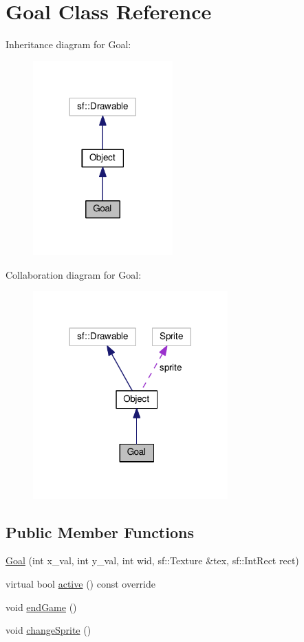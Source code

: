 \hypertarget{classGoal}{\section{Goal Class Reference}
\label{classGoal}
}


Inheritance diagram for Goal\+:
\nopagebreak
\begin{figure}[H]
\begin{center}
\leavevmode
\includegraphics[width=152pt]{classGoal__inherit__graph}
\end{center}
\end{figure}


Collaboration diagram for Goal\+:
\nopagebreak
\begin{figure}[H]
\begin{center}
\leavevmode
\includegraphics[width=212pt]{classGoal__coll__graph}
\end{center}
\end{figure}
\subsection*{Public Member Functions}
\begin{DoxyCompactItemize}
\item 
\hyperlink{classGoal_a579c482283005118e153af04d12d6326}{Goal} (int x\+\_\+val, int y\+\_\+val, int wid, sf\+::\+Texture \&tex, sf\+::\+Int\+Rect rect)
\item 
virtual bool \hyperlink{classGoal_ad23408eab330967a7fe0d13e580c667a}{active} () const override
\item 
void \hyperlink{classGoal_a4126af8f725af061df89124c1d9d2dfb}{end\+Game} ()
\item 
void \hyperlink{classGoal_adee29e993c9b988bd0cc15a12c86452d}{change\+Sprite} ()
\end{DoxyCompactItemize}
